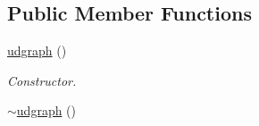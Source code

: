 \subsection*{Public Member Functions}
\begin{DoxyCompactItemize}
\item 
\hyperlink{classlgraph_1_1utils_1_1udgraph_ac67664542d6a8e674781adc1466905af}{udgraph} ()\hypertarget{classlgraph_1_1utils_1_1udgraph_ac67664542d6a8e674781adc1466905af}{}\label{classlgraph_1_1utils_1_1udgraph_ac67664542d6a8e674781adc1466905af}

\begin{DoxyCompactList}\small\item\em Constructor. \end{DoxyCompactList}\item 
\hyperlink{classlgraph_1_1utils_1_1udgraph_afcdd7cc64bcb8d41ba230742753c6867}{$\sim$udgraph} ()\hypertarget{classlgraph_1_1utils_1_1udgraph_afcdd7cc64bcb8d41ba230742753c6867}{}\label{classlgraph_1_1utils_1_1udgraph_afcdd7cc64bcb8d41ba230742753c6867}


\end{DoxyCompactItemize}
